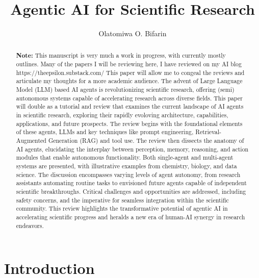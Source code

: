 \documentclass{article}
\title{Agentic AI for Scientific Research}
\author{Olatomiwa O. Bifarin}
\affil{School of Chemistry and Biochemistry\\Georgia Institute of Technology}
\begin{document}
\maketitle

\begin{abstract}
{\color{red}\textbf{Note:} This manuscript is very much a work in progress, with 
    currently mostly outlines. Many of the papers I will be reviewing here, I have 
    reviewed on my AI blog https://theepsilon.substack.com/ This paper will 
    allow me to congeal the reviews and articulate my thoughts for a more academic audience.}    
    The advent of Large Language Model (LLM) based AI agents is revolutionizing scientific research, 
    offering (semi) autonomous systems capable of accelerating research across diverse fields. 
    This paper will double as a tutorial and review that examines the current landscape of AI agents 
    in scientific research, exploring their rapidly evoloving architecture, 
    capabilities, applications, and future prospects. The review begins with the foundational 
    elements of these agents, LLMs and key techniques like prompt engineering, Retrieval-Augmented Generation (RAG)
    and tool use. The review then dissects the anatomy of AI agents, elucidating the interplay 
    between perception, memory, reasoning, and action modules that enable autonomous functionality. 
    Both single-agent and multi-agent systems are presented, with illustrative examples from chemistry, 
    biology, and data science. The discussion encompasses varying levels of agent autonomy, from research 
    assistants automating routine tasks to envisioned future agents capable of independent scientific 
    breakthroughs. Critical challenges and opportunities are addressed, including safety concerns, 
    and the imperative for seamless integration within the scientific community. This review highlights the 
    transformative potential of agentic AI in accelerating scientific progress and heralds a 
    new era of human-AI synergy in research endeavors.
\end{abstract}

\section{Introduction}
\end{document}
